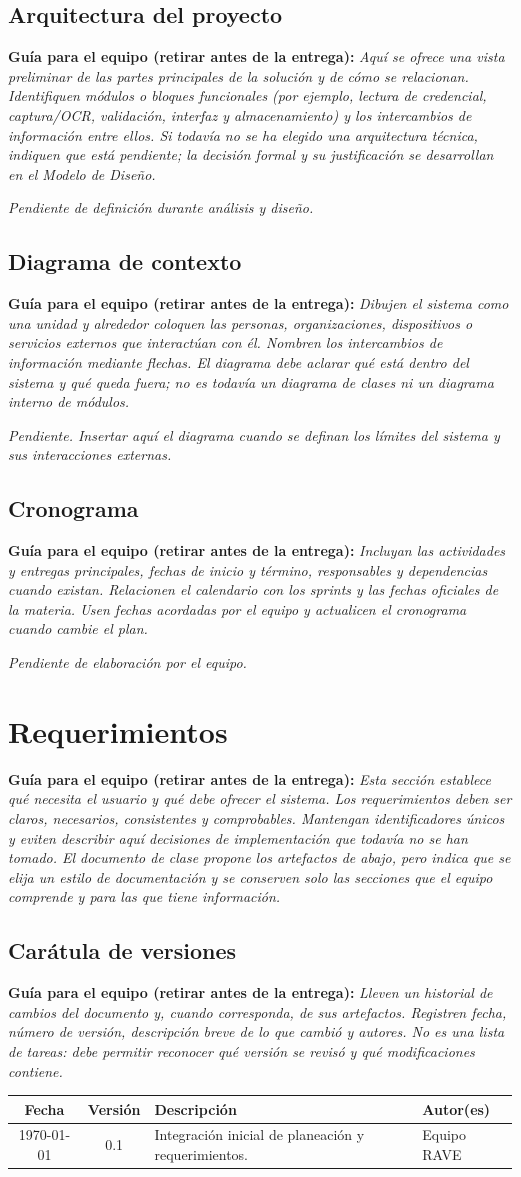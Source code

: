 \documentclass[12pt,letterpaper]{article}
\newcommand{\guia}[1]{\par\smallskip\noindent\textbf{Guía para el equipo (retirar antes de la entrega):} \textit{#1}\par\smallskip}
\begin{document}
\subsection{Arquitectura del proyecto}
\guia{Aquí se ofrece una vista preliminar de las partes principales de la solución y de cómo se relacionan. Identifiquen módulos o bloques funcionales (por ejemplo, lectura de credencial, captura/OCR, validación, interfaz y almacenamiento) y los intercambios de información entre ellos. Si todavía no se ha elegido una arquitectura técnica, indiquen que está pendiente; la decisión formal y su justificación se desarrollan en el Modelo de Diseño.}
\textit{Pendiente de definición durante análisis y diseño.}
\subsection{Diagrama de contexto}
\guia{Dibujen el sistema como una unidad y alrededor coloquen las personas, organizaciones, dispositivos o servicios externos que interactúan con él. Nombren los intercambios de información mediante flechas. El diagrama debe aclarar qué está dentro del sistema y qué queda fuera; no es todavía un diagrama de clases ni un diagrama interno de módulos.}
\textit{Pendiente. Insertar aquí el diagrama cuando se definan los límites del sistema y sus interacciones externas.}
\subsection{Cronograma}
\guia{Incluyan las actividades y entregas principales, fechas de inicio y término, responsables y dependencias cuando existan. Relacionen el calendario con los sprints y las fechas oficiales de la materia. Usen fechas acordadas por el equipo y actualicen el cronograma cuando cambie el plan.}
\textit{Pendiente de elaboración por el equipo.}
\section{Requerimientos}
\guia{Esta sección establece qué necesita el usuario y qué debe ofrecer el sistema. Los requerimientos deben ser claros, necesarios, consistentes y comprobables. Mantengan identificadores únicos y eviten describir aquí decisiones de implementación que todavía no se han tomado. El documento de clase propone los artefactos de abajo, pero indica que se elija un estilo de documentación y se conserven solo las secciones que el equipo comprende y para las que tiene información.}
\subsection{Carátula de versiones}
\guia{Lleven un historial de cambios del documento y, cuando corresponda, de sus artefactos. Registren fecha, número de versión, descripción breve de lo que cambió y autores. No es una lista de tareas: debe permitir reconocer qué versión se revisó y qué modificaciones contiene.}
\begin{tabularx}{\textwidth}{|c|c|X|X|}
\hline Fecha & Versión & Descripción & Autor(es) \\ \hline
\today & 0.1 & Integración inicial de planeación y requerimientos. & Equipo RAVE \\ \hline
\end{tabularx}
\end{document}
